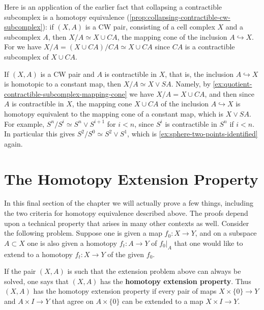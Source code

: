 \begin{example}
\label{ex:quotient-contractible-subcomplex-mapping-cone}
Here is an application of the earlier fact that collapsing a contractible subcomplex
is a homotopy equivalence (\cref{prop:collapsing-contractible-cw-subcomplex}): if
$(X,A)$ is a CW pair, consisting of a cell complex $X$ and a subcomplex $A$, then
$X/A \simeq X \cup CA$, the mapping cone of the inclusion $A \hookrightarrow X$. For we have
$X/A = (X \cup CA)/CA \simeq X \cup CA$ since $CA$ is a contractible subcomplex of
$X \cup CA$.
\end{example}

\begin{example}
\label{ex:quotient-by-contractible-in-x}
If $(X,A)$ is a CW pair and $A$ is contractible in $X$, that is, the inclusion
$A \hookrightarrow X$ is homotopic to a constant map, then $X/A \simeq X \vee SA$. Namely, by
\cref{ex:quotient-contractible-subcomplex-mapping-cone} we have $X/A = X \cup CA$, and
then since $A$ is contractible in $X$, the mapping cone $X \cup CA$ of the inclusion
$A \hookrightarrow X$ is homotopy equivalent to the mapping cone of a constant map, which
is $X \vee SA$. For example, $S^n/S^i \simeq S^n \vee S^{i+1}$ for $i < n$, since $S^i$ is
contractible in $S^n$ if $i < n$. In particular this gives $S^2/S^0 \simeq S^2 \vee S^1$, which is
\cref{ex:sphere-two-points-identified} again.
\end{example}

\section{The Homotopy Extension Property}
\label{sec:homotopy-extension-property}

In this final section of the chapter we will actually prove a few things, including
the two criteria for homotopy equivalence described above. The proofs depend upon a
technical property that arises in many other contexts as well. Consider the following
problem. Suppose one is given a map $f_0 : X \to Y$, and on a subspace $A \subset X$ one
is also given a homotopy $f_t : A \to Y$ of $f_0|_A$ that one would like to extend to a
homotopy $f_t : X \to Y$ of the given $f_0$.

\begin{definition}
\label{def:homotopy-extension-property}
\leanok
{}
If the pair $(X,A)$ is such that the extension problem above can always be solved,
one says that $(X,A)$ has the \textbf{homotopy extension property}. Thus $(X,A)$ has
the homotopy extension property if every pair of maps $X \times \{0\} \to Y$ and
$A \times I \to Y$ that agree on $A \times \{0\}$ can be extended to a map $X \times I \to Y$.
\end{definition}

